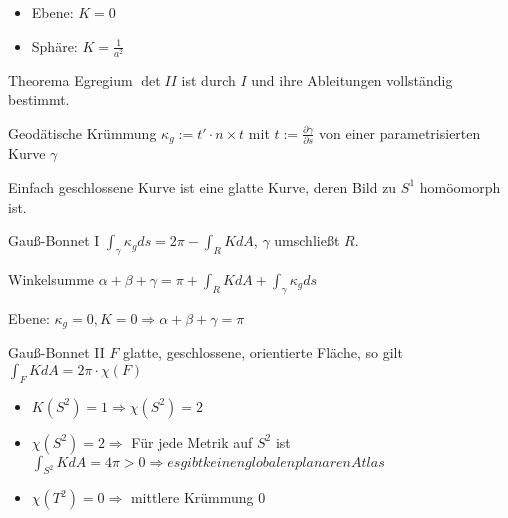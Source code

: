 \begin{bsp}
    \begin{itemize}
        \item Ebene: $K=0$
        \item Sphäre: $K=\frac{1}{a^2}$
    \end{itemize}
\end{bsp}

\begin{satz}{Theorema Egregium}
    $\det II$ ist durch $I$ und ihre Ableitungen vollständig bestimmt.
\end{satz}

\begin{defi}{Geodätische Krümmung}
    $\kappa_g := t'\cdot n\times t$ mit $t:=\frac{\partial \gamma}{\partial s}$
    von einer parametrisierten Kurve $\gamma$
\end{defi}

\begin{defi}{Einfach geschlossene Kurve}
    ist eine glatte Kurve, deren Bild zu $S^1$ homöomorph ist.
\end{defi}

\begin{satz}{Gauß-Bonnet I}
    $\int_\gamma \kappa_g ds = 2\pi - \int_R KdA$,
    $\gamma$ umschließt $R$.
\end{satz}

\begin{kor}
    Winkelsumme $\alpha + \beta + \gamma = \pi + \int_R KdA + \int_\gamma \kappa_g ds$
\end{kor}

\begin{bsp}
    Ebene: $\kappa_g=0,K=0 \Rightarrow \alpha + \beta + \gamma = \pi$
\end{bsp}

\begin{satz}{Gauß-Bonnet II}
    $F$ glatte, geschlossene, orientierte Fläche, so gilt
    $\int_F KdA = 2\pi \cdot \chi(F)$
\end{satz}

\begin{bsp}
    \begin{itemize}
        \item $K(S^2)=1 \Rightarrow \chi(S^2)=2$
        \item $\chi(S^2)=2 \Rightarrow$ Für jede Metrik auf $S^2$ ist $\int_{S^2}KdA=4\pi>0 
            \Rightarrow es gibt keinen globalen planaren Atlas$
        \item $\chi(T^2)=0 \Rightarrow $ mittlere Krümmung 0
    \end{itemize}
\end{bsp}